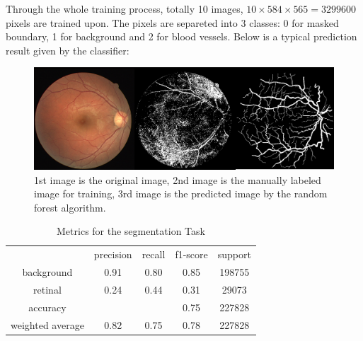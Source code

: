 \documentclass[final]{article}
\begin{document}
    Through the whole training process, totally 10 images, \(10 \times 584 \times 565 = 3299600\) pixels are trained upon. The pixels are separeted into 3 classes: 0 for masked boundary, 1 for background and 2 for blood vessels. Below is a typical prediction result given by the classifier:

    \begin{figure}[H]
        \centering
            \centering
            \includegraphics[scale=0.4]{Figures/mjc.png}
            \caption{1st image is the original image, 2nd image is the manually labeled image for training, 3rd image is the predicted image by the random forest algorithm.}\label{fig:mjct27}
    \end{figure}
    \noindent

    \begin{table}[H]
        \caption{Metrics for the segmentation Task}
        \begin{tabular}{ccccc}
                         & precision & recall & f1-score & support \\
        background       & 0.91      & 0.80   & 0.85     & 198755  \\
        retinal          & 0.24      & 0.44   & 0.31     & 29073   \\
        accuracy         &           &        & 0.75     & 227828  \\
        weighted average & 0.82      & 0.75   & 0.78     & 227828  
        \end{tabular}
    \end{table}
\end{document}
